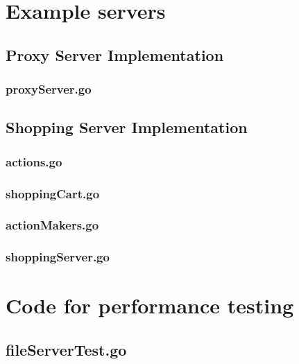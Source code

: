 \begin{appendices}
\section{Example servers}

\subsection{Proxy Server Implementation}
\label{sec:proxyServer.go}
\subsubsection{proxyServer.go}


\newpage
\subsection{Shopping Server Implementation}
\label{sec:shopping.go}
\subsubsection{actions.go}

\subsubsection{shoppingCart.go}

\subsubsection{actionMakers.go}

\newpage
\subsubsection{shoppingServer.go}


\newpage
\section{Code for performance testing}
\label{sec:testing.go}
\subsection{fileServerTest.go}



\end{appendices}
